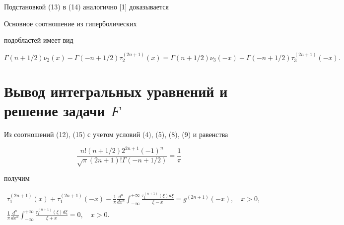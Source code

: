 Подстановкой (13) в (14) аналогично [1] доказывается





\begin{lem}


Основное соотношение из гиперболических


подобластей имеет вид


\begin{equation}


\Gamma(n+1/2)\nu_2(x) - \Gamma(-n+1/2)\tau_2^{(2n+1)}(x)=


\Gamma(n+1/2)\nu_3(-x) +


\Gamma(-n+1/2)\tau_3^{(2n+1)}(-x).


\end{equation}


\end{lem}





\section{Вывод интегральных уравнений и решение задачи $F$}





Из соотношений (12), (15) с учетом условий (4), (5), (8), (9) и равенства


$$


\frac{n!(n+1/2)2^{2n+1}(-1)^n}{\sqrt{\pi}(2n+1)!\Gamma(-n+1/2)}


=\frac{1}{\pi}


$$


получим


\begin{gather}


\tau_1^{(2n+1)}(x) + \tau_1^{(2n+1)}(-x) -


\frac{1}{\pi}\frac{d^n}{dx^n} \int_{-\infty}^{+\infty}


\frac{\tau_1^{(n+1)}(\xi)d\xi}{\xi-x}


=g^{(2n+1)}(-x),\quad x>0, \\


%


\frac{1}{\pi}\frac{d^n}{dx^n} \int_{-\infty}^{+\infty}


\frac{\tau_1^{(n+1)}(\xi)d\xi}{\xi+x}=0, \quad x>0.


\end{gather}





